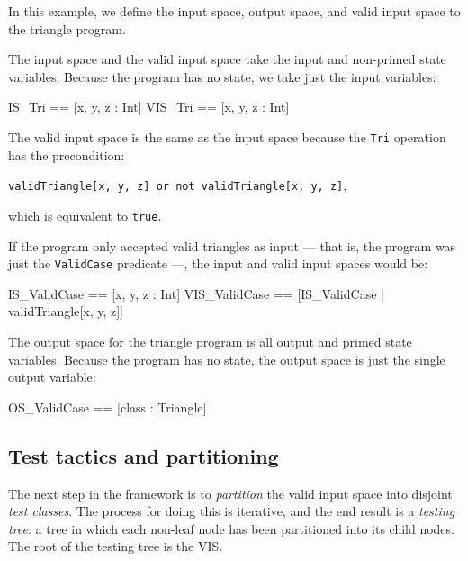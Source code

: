 \begin{example}
\label{ex:ttf:triangle-is-vis-os}
In this example, we define the input space, output space, and valid input space to the triangle program.

The input space and the valid input space take the input and non-primed state variables. Because the program has no state, we take just the input variables:

\lstset{aboveskip=3mm}
\lstset{language=}
\begin{alloy}
 IS_Tri == [x, y, z : Int]
 VIS_Tri == [x, y, z : Int]
\end{alloy}

The valid input space is the same as the input space because the \texttt{Tri} operation has the precondition:

\quad \verb+validTriangle[x, y, z] or not validTriangle[x, y, z]+,

which is equivalent to \texttt{true}. 

If the program only accepted valid triangles as input --- that is, the program was just the \texttt{ValidCase} predicate ---, the input and valid input spaces would be:

\lstset{aboveskip=3mm}
\lstset{language=}
\begin{alloy}
 IS_ValidCase == [x, y, z : Int]
 VIS_ValidCase == [IS_ValidCase | validTriangle[x, y, z]]
\end{alloy}

The output space for the triangle program is all output and primed state variables. Because the program has no state, the output space is just the single output variable:

\lstset{aboveskip=3mm}
\lstset{language=}
\begin{alloy}
 OS_ValidCase == [class : Triangle]
\end{alloy}


\end{example}

\subsection{Test tactics and partitioning}

The next step in the framework is to \emph{partition} the valid input space into disjoint \emph{test classes}. The process for doing this is iterative, and the end result is a \emph{testing tree}: a tree in which each non-leaf node has been partitioned into its child nodes. The root of the testing tree is the VIS.

